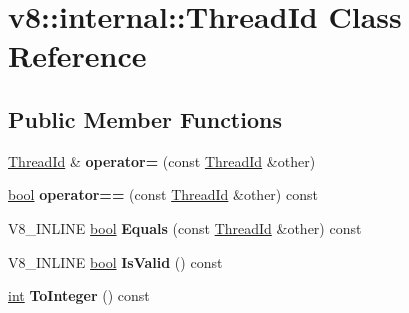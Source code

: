 \hypertarget{classv8_1_1internal_1_1ThreadId}{}\section{v8\+:\+:internal\+:\+:Thread\+Id Class Reference}
\label{classv8_1_1internal_1_1ThreadId}
\subsection*{Public Member Functions}
\begin{DoxyCompactItemize}
\item 
\mbox{\label{classv8_1_1internal_1_1ThreadId_ac20b0254b1e4dba24c11381a3a370475}} 
\mbox{\hyperlink{classv8_1_1internal_1_1ThreadId}{Thread\+Id}} \& {\bfseries operator=} (const \mbox{\hyperlink{classv8_1_1internal_1_1ThreadId}{Thread\+Id}} \&other)
\item 
\mbox{\label{classv8_1_1internal_1_1ThreadId_a8e938da32c31d2695c547f560a763672}} 
\mbox{\hyperlink{classbool}{bool}} {\bfseries operator==} (const \mbox{\hyperlink{classv8_1_1internal_1_1ThreadId}{Thread\+Id}} \&other) const
\item 
\mbox{\label{classv8_1_1internal_1_1ThreadId_aae3c29a4ab8fe6ce469033a87e903a6c}} 
V8\+\_\+\+I\+N\+L\+I\+NE \mbox{\hyperlink{classbool}{bool}} {\bfseries Equals} (const \mbox{\hyperlink{classv8_1_1internal_1_1ThreadId}{Thread\+Id}} \&other) const
\item 
\mbox{\label{classv8_1_1internal_1_1ThreadId_aceb520076a0e073f4f8285bd7c1ceb78}} 
V8\+\_\+\+I\+N\+L\+I\+NE \mbox{\hyperlink{classbool}{bool}} {\bfseries Is\+Valid} () const
\item 
\mbox{\label{classv8_1_1internal_1_1ThreadId_a7838c10370c127711578446471c9579d}} 
\mbox{\hyperlink{classint}{int}} {\bfseries To\+Integer} () const
\end{DoxyCompactItemize}
